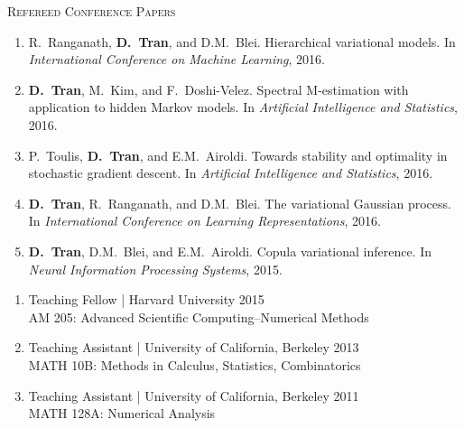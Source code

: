 \documentclass[11pt]{article}
\renewcommand{\section}[1]
{\vspace{1.0\baselineskip}{\Large\textbf{#1}}}
\begin{document}

\textsc{Refereed Conference Papers}
\begin{enumerate}[resume]
  \item
  R.~Ranganath, \textbf{D.~Tran}, and D.M.~Blei.
  Hierarchical variational models.
  In \emph{International Conference on Machine Learning}, 2016.
  \item
  \textbf{D.~Tran}, M.~Kim, and F.~Doshi-Velez.
  Spectral M-estimation with application to hidden Markov models.
  In \emph{Artificial Intelligence and Statistics}, 2016.
  \item
  P.~Toulis, \textbf{D.~Tran}, and E.M.~Airoldi.
  Towards stability and optimality in stochastic gradient descent.
  In \emph{Artificial Intelligence and Statistics}, 2016.
  \item
  \textbf{D.~Tran}, R.~Ranganath, and D.M.~Blei.
  The variational Gaussian process.
  In \emph{International Conference on Learning Representations}, 2016.
  \item
  \textbf{D.~Tran}, D.M.~Blei, and E.M.~Airoldi.
  Copula variational inference.
  In \emph{Neural Information Processing Systems}, 2015.
\end{enumerate}




\section{Teaching}
\begin{enumerate}
  \item
  Teaching Fellow |
  Harvard University
  \hfill 2015
  \\
  AM 205:
  Advanced Scientific Computing--Numerical Methods
  \item
  Teaching Assistant |
  University of California, Berkeley
  \hfill 2013
  \\
  MATH 10B:
  Methods in Calculus, Statistics, Combinatorics
  \item
  Teaching Assistant |
  University of California, Berkeley
  \hfill 2011
  \\
  MATH 128A:
  Numerical Analysis
\end{enumerate}
\end{document}
